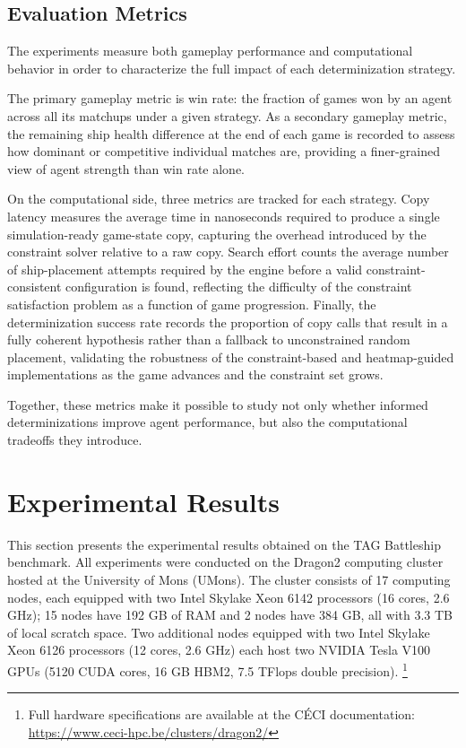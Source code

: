\subsection{Evaluation Metrics}

The experiments measure both gameplay performance and computational behavior in order to characterize the full impact of each determinization strategy.

The primary gameplay metric is win rate: the fraction of games won by an agent across all its matchups under a given strategy. As a secondary gameplay metric, the remaining ship health difference at the end of each game is recorded to assess how dominant or competitive individual matches are, providing a finer-grained view of agent strength than win rate alone.

On the computational side, three metrics are tracked for each strategy. Copy latency measures the average time in nanoseconds required to produce a single simulation-ready game-state copy, capturing the overhead introduced by the constraint solver relative to a raw copy. Search effort counts the average number of ship-placement attempts required by the engine before a valid constraint-consistent configuration is found, reflecting the difficulty of the constraint satisfaction problem as a function of game progression. Finally, the determinization success rate records the proportion of copy calls that result in a fully coherent hypothesis rather than a fallback to unconstrained random placement, validating the robustness of the constraint-based and heatmap-guided implementations as the game advances and the constraint set grows.

Together, these metrics make it possible to study not only whether informed determinizations improve agent performance, but also the computational tradeoffs they introduce.

\newpage

\section{Experimental Results}
\label{sec:results}

This section presents the experimental results obtained on the TAG 
Battleship benchmark. All experiments were conducted on the Dragon2 computing cluster hosted at the University of Mons (UMons). The cluster consists of 17 computing nodes, each equipped with two Intel Skylake Xeon 6142 processors 
(16 cores, 2.6 GHz); 15 nodes have 192 GB of RAM and 2 nodes have 
384 GB, all with 3.3 TB of local scratch space. Two additional nodes 
equipped with two Intel Skylake Xeon 6126 processors (12 cores, 
2.6 GHz) each host two NVIDIA Tesla V100 GPUs (5120 CUDA cores, 
16 GB HBM2, 7.5 TFlops double precision).%
\footnote{Full hardware specifications are available at the CÉCI 
documentation: \url{https://www.ceci-hpc.be/clusters/dragon2/}}

